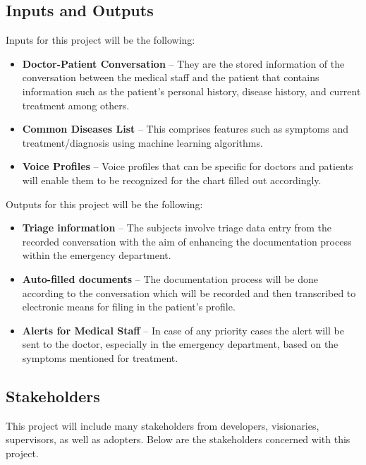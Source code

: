 \documentclass{article}
\begin{document}
\subsection{Inputs and Outputs}
Inputs for this project will be the following:

\begin{itemize}
    \item \textbf{Doctor-Patient Conversation} -- They are the stored information of the conversation between the medical staff and the patient that contains information such as the patient’s personal history, disease history, and current treatment among others.
    \item \textbf{Common Diseases List} -- This comprises features such as symptoms and treatment/diagnosis using machine learning algorithms.
    \item \textbf{Voice Profiles} -- Voice profiles that can be specific for doctors and patients will enable them to be recognized for the chart filled out accordingly. 
\end {itemize}

Outputs for this project will be the following: 

\begin{itemize} 
    \item \textbf{Triage information} -- The subjects involve triage data entry from the recorded conversation with the aim of enhancing the documentation process within the emergency department.
    \item \textbf{Auto-filled documents} -- The documentation process will be done according to the conversation which will be recorded and then transcribed to electronic means for filing in the patient’s profile.
    \item \textbf{Alerts for Medical Staff} -- In case of any priority cases the alert will be sent to the doctor, especially in the emergency department, based on the symptoms mentioned for treatment.
\end{itemize}

\subsection{Stakeholders}

This project will include many stakeholders from developers, visionaries, supervisors, as well as adopters. Below are the stakeholders concerned with this project.
\end{document}
